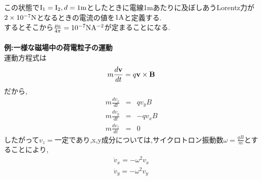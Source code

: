 \documentclass[../main]{subfiles}
\begin{document}
この状態で${\rm I_1}={\rm I_2},d=1{\rm m}$としたときに電線1mあたりに及ぼしあうLorentz力が$2 \times 10^{-7} {\rm N}$となるときの電流の値を$1{\rm A}$と定義する. \\
するとそこから$\frac{\mu_0}{4 \pi}=10^{-7} {\rm NA^{-2}}$が定まることになる. \\
\\
{\bf 例:一様な磁場中の荷電粒子の運動} \\
運動方程式は
\begin{eqnarray*}
m\frac{d{\bf v}}{dt}=q{\bf v} \times {\bf B}
\end{eqnarray*}
だから,
\begin{eqnarray*}
m\frac{dv_x}{dt}&=&qv_yB \\
m\frac{dv_y}{dt}&=&-qv_xB \\
m\frac{dv_z}{dt}&=&0
\end{eqnarray*}
したがって$v_z=\mbox{一定}$であり,x,y成分については,サイクロトロン振動数$\omega=\frac{qB}{m}$とすることにより,
\begin{eqnarray*}
\ddot{v}_x=-\omega^2v_x \\
\ddot{v}_y=-\omega^2v_y
\end{eqnarray*}
\end{document}
